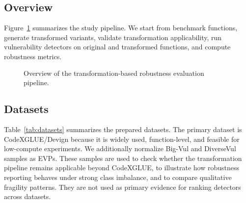 \documentclass[a4paper,fleqn]{cas-dc}
\begin{document}
\subsection{Overview}

Figure~\ref{fig:pipeline} summarizes the study pipeline. We start from
benchmark functions, generate transformed variants, validate transformation
applicability, run vulnerability detectors on original and transformed
functions, and compute robustness metrics.

\begin{figure}[t]
  \centering
  \resizebox{\textwidth}{!}{}
  \caption{Overview of the transformation-based robustness evaluation pipeline.}
  \label{fig:pipeline}
\end{figure}

\subsection{Datasets}

Table~\ref{tab:datasets} summarizes the prepared datasets. The primary dataset
is CodeXGLUE/Devign because it is widely used, function-level, and feasible for
low-compute experiments. We additionally normalize Big-Vul and DiverseVul
samples as EVPs. These samples are used to check whether
the transformation pipeline remains applicable beyond CodeXGLUE, to illustrate
how robustness reporting behaves under strong class imbalance, and to compare
qualitative fragility patterns. They are not used as primary evidence for
ranking detectors across datasets.

\begin{table}[t]
  \centering
  \caption{Prepared dataset statistics after normalization. Median token counts use the VulBERTa and LineVul tokenizers used in the exact public runs.}
  \label{tab:datasets}
\end{table}
\end{document}
